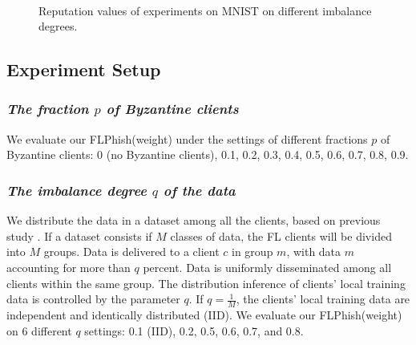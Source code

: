 \documentclass[journal]{IEEEtran}
\begin{document}
\begin{figure}[!htp]
  \\
  \caption{Reputation values of experiments on MNIST on different imbalance degrees.}
  \label{fig_exp_reputation}
  \vspace{0.2in}
\end{figure}


\subsection{Experiment Setup}


  \subsubsection{{\textit{The fraction {$p$} of Byzantine clients}}} We evaluate our FLPhish(weight) under the settings of different fractions $p$ of Byzantine clients: 0 (no Byzantine clients), 0.1, 0.2, 0.3, 0.4, 0.5, 0.6, 0.7, 0.8, 0.9.
  \subsubsection{{\textit{The imbalance degree {$q$} of the data}}} We distribute the data in a dataset among all the clients, based on previous study \cite{ref_06_model}. If a dataset consists if $M$ classes of data, the FL clients will be divided into $M$ groups. Data is delivered to a client $c$ in group $m$, with data $m$ accounting for more than $q$ percent. Data is uniformly disseminated among all clients within the same group. The distribution inference of clients' local training data is controlled by the parameter $q$. If $q=\frac{1}{M}$, the clients' local training data are independent and identically distributed (IID). We evaluate our FLPhish(weight) on 6 different $q$ settings: 0.1 (IID), 0.2, 0.5, 0.6, 0.7, and 0.8.
\end{document}
